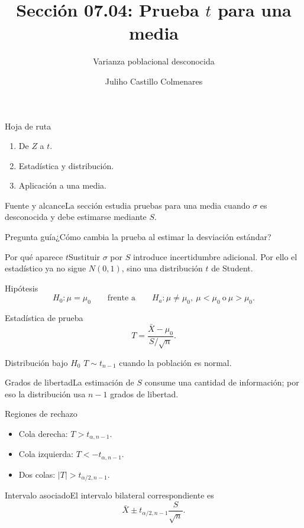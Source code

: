 \documentclass[10pt,aspectratio=169]{beamer}
\title[Prueba $t$ para una media]{Sección 07.04: Prueba $t$ para una media}\subtitle{Varianza poblacional desconocida}
\author[J. Castillo Colmenares]{Juliho Castillo Colmenares}\institute{Tecnológico de Monterrey}\date{}
\begin{document}
\begin{frame}[plain]\titlepage\end{frame}
\begin{frame}{Hoja de ruta}\small\begin{enumerate}\item De $Z$ a $t$.\item Estadística y distribución.\item Aplicación a una media.\end{enumerate}\end{frame}
\begin{frame}{Fuente y alcance}\small La sección estudia pruebas para una media cuando $\sigma$ es desconocida y debe estimarse mediante $S$.\begin{block}{Pregunta guía}¿Cómo cambia la prueba al estimar la desviación estándar?\end{block}\end{frame}
\begin{frame}{Por qué aparece $t$}\small Sustituir $\sigma$ por $S$ introduce incertidumbre adicional. Por ello el estadístico ya no sigue $N(0,1)$, sino una distribución $t$ de Student.\end{frame}
\begin{frame}{Hipótesis}\small\[H_0:\mu=\mu_0\qquad\text{frente a}\qquad H_a:\mu\neq\mu_0,\ \mu<\mu_0\ \text{o}\ \mu>\mu_0.\]\end{frame}
\begin{frame}{Estadística de prueba}\small\[T=\frac{\bar X-\mu_0}{S/\sqrt n}.\]\begin{block}{Distribución bajo $H_0$} $T\sim t_{n-1}$ cuando la población es normal.\end{block}\end{frame}
\begin{frame}{Grados de libertad}\small La estimación de $S$ consume una cantidad de información; por eso la distribución usa $n-1$ grados de libertad.\end{frame}
\begin{frame}{Regiones de rechazo}\small\begin{itemize}\item Cola derecha: $T>t_{\alpha,n-1}$.\item Cola izquierda: $T<-t_{\alpha,n-1}$.\item Dos colas: $|T|>t_{\alpha/2,n-1}$.\end{itemize}\end{frame}
\begin{frame}{Intervalo asociado}\small El intervalo bilateral correspondiente es\[\bar X\pm t_{\alpha/2,n-1}\frac{S}{\sqrt n}.\]\end{frame}
\end{document}
